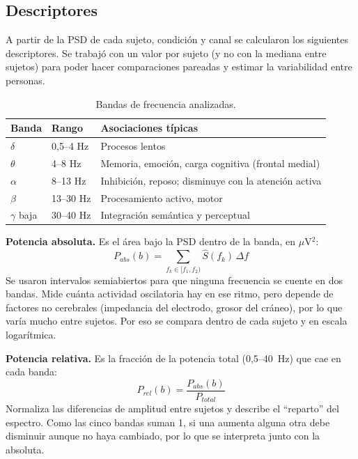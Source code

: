 \documentclass[11pt,a4paper]{article}
\begin{document}
\subsection{Descriptores}
\label{sec:descriptores}
A partir de la PSD de cada sujeto, condición y canal se calcularon los siguientes descriptores. Se trabajó con un valor por sujeto (y no con la mediana entre sujetos) para poder hacer comparaciones pareadas y estimar la variabilidad entre personas.

\begin{table}[H]
\centering
\caption{Bandas de frecuencia analizadas.}
\label{tab:bandas}
\begin{tabular}{lll}
\toprule
Banda & Rango & Asociaciones típicas \\
\midrule
$\delta$ & 0,5--4 Hz & Procesos lentos \\
$\theta$ & 4--8 Hz & Memoria, emoción, carga cognitiva (frontal medial) \\
$\alpha$ & 8--13 Hz & Inhibición, reposo; disminuye con la atención activa \\
$\beta$ & 13--30 Hz & Procesamiento activo, motor \\
$\gamma$ baja & 30--40 Hz & Integración semántica y perceptual \\
\bottomrule
\end{tabular}
\end{table}

\textbf{Potencia absoluta.} Es el área bajo la PSD dentro de la banda, en $\mu$V$^2$:
\begin{equation}
  P_{abs}(b) = \sum_{f_k \in [f_1, f_2)} \hat{S}(f_k)\,\Delta f
\end{equation}
Se usaron intervalos semiabiertos para que ninguna frecuencia se cuente en dos bandas. Mide cuánta actividad oscilatoria hay en ese ritmo, pero depende de factores no cerebrales (impedancia del electrodo, grosor del cráneo), por lo que varía mucho entre sujetos. Por eso se compara dentro de cada sujeto y en escala logarítmica.

\textbf{Potencia relativa.} Es la fracción de la potencia total (0,5--40~Hz) que cae en cada banda:
\begin{equation}
  P_{rel}(b) = \frac{P_{abs}(b)}{P_{total}}
\end{equation}
Normaliza las diferencias de amplitud entre sujetos y describe el ``reparto'' del espectro. Como las cinco bandas suman 1, si una aumenta alguna otra debe disminuir aunque no haya cambiado, por lo que se interpreta junto con la absoluta.
\end{document}
